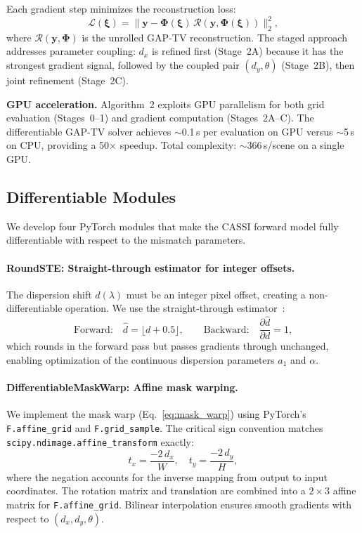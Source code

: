 \documentclass[runningheads]{llncs}
\begin{document}
Each gradient step minimizes the reconstruction loss:
\begin{equation}
    \mathcal{L}(\boldsymbol{\xi}) = \|\mathbf{y} - \mathbf{\Phi}(\boldsymbol{\xi})\,\mathcal{R}(\mathbf{y}, \mathbf{\Phi}(\boldsymbol{\xi}))\|_2^2,
    \label{eq:loss}
\end{equation}
where $\mathcal{R}(\mathbf{y}, \mathbf{\Phi})$ is the unrolled GAP-TV reconstruction.
The staged approach addresses parameter coupling: $d_x$ is refined first (Stage~2A) because it has the strongest gradient signal, followed by the coupled pair $(d_y, \theta)$ (Stage~2B), then joint refinement (Stage~2C).

\textbf{GPU acceleration.}
Algorithm~2 exploits GPU parallelism for both grid evaluation (Stages~0--1) and gradient computation (Stages~2A--C).
The differentiable GAP-TV solver achieves $\sim$0.1\,s per evaluation on GPU versus $\sim$5\,s on CPU, providing a 50$\times$ speedup.
Total complexity: $\sim$366\,s/scene on a single GPU.

\subsection{Differentiable Modules}
\label{sec:modules}

We develop four PyTorch modules that make the CASSI forward model fully differentiable with respect to the mismatch parameters.

\paragraph{RoundSTE: Straight-through estimator for integer offsets.}
The dispersion shift $d(\lambda)$ must be an integer pixel offset, creating a non-differentiable operation.
We use the straight-through estimator~\cite{bengio2013ste}:
\begin{equation}
    \text{Forward:} \quad \hat{d} = \lfloor d + 0.5 \rfloor, \qquad
    \text{Backward:} \quad \frac{\partial \hat{d}}{\partial d} = 1,
    \label{eq:ste}
\end{equation}
which rounds in the forward pass but passes gradients through unchanged, enabling optimization of the continuous dispersion parameters $a_1$ and $\alpha$.

\paragraph{DifferentiableMaskWarp: Affine mask warping.}
We implement the mask warp (Eq.~\ref{eq:mask_warp}) using PyTorch's \texttt{F.affine\_grid} and \texttt{F.grid\_sample}.
The critical sign convention matches \texttt{scipy.ndimage.affine\_transform} exactly:
\begin{equation}
    t_x = \frac{-2\,d_x}{W}, \quad t_y = \frac{-2\,d_y}{H},
    \label{eq:sign}
\end{equation}
where the negation accounts for the inverse mapping from output to input coordinates.
The rotation matrix and translation are combined into a $2\times3$ affine matrix for \texttt{F.affine\_grid}.
Bilinear interpolation ensures smooth gradients with respect to $(d_x, d_y, \theta)$.
\end{document}
